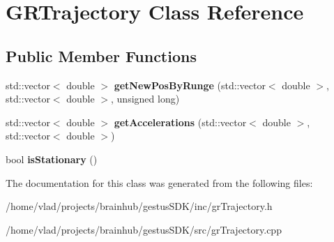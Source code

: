 \hypertarget{classGRTrajectory}{}\section{G\+R\+Trajectory Class Reference}
\label{classGRTrajectory}
\subsection*{Public Member Functions}
\begin{DoxyCompactItemize}
\item 
\mbox{\label{classGRTrajectory_a5291dde0aa722148384ed74708aed2bf}} 
std\+::vector$<$ double $>$ {\bfseries get\+New\+Pos\+By\+Runge} (std\+::vector$<$ double $>$, std\+::vector$<$ double $>$, unsigned long)
\item 
\mbox{\label{classGRTrajectory_a779417f0ab395c0796b332a96e29475c}} 
std\+::vector$<$ double $>$ {\bfseries get\+Accelerations} (std\+::vector$<$ double $>$, std\+::vector$<$ double $>$)
\item 
\mbox{\label{classGRTrajectory_a49090aa434aaf201dc94100d75b262b6}} 
bool {\bfseries is\+Stationary} ()
\end{DoxyCompactItemize}


The documentation for this class was generated from the following files\+:\begin{DoxyCompactItemize}
\item 
/home/vlad/projects/brainhub/gestus\+S\+D\+K/inc/gr\+Trajectory.\+h\item 
/home/vlad/projects/brainhub/gestus\+S\+D\+K/src/gr\+Trajectory.\+cpp\end{DoxyCompactItemize}
